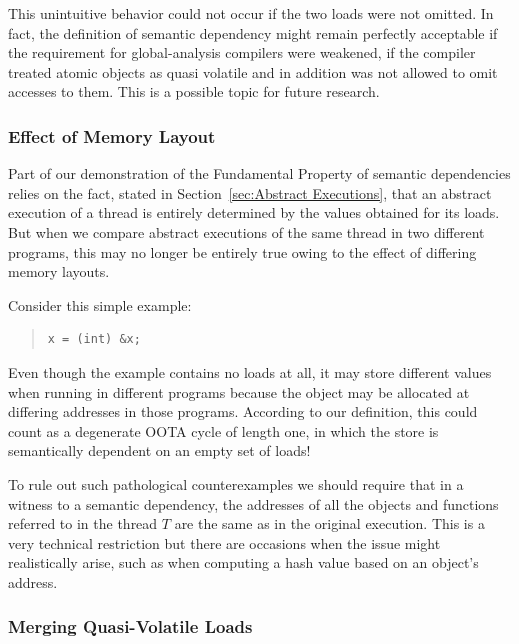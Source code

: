 \documentclass[10]{article}
\begin{document}
This unintuitive behavior could not occur if the two loads were not
omitted.
In fact, the definition of semantic dependency might remain
perfectly acceptable if the requirement for global-analysis compilers
were weakened, if the compiler treated atomic objects as quasi
volatile and in addition was not allowed to omit accesses to them.
This is a possible topic for future research.

\subsubsection{Effect of Memory Layout}
\label{sec:Effect of Memory Layout}

Part of our demonstration of the Fundamental Property of semantic
dependencies relies on the fact, stated in
Section~\ref{sec:Abstract Executions},
that an abstract execution of a thread is entirely determined by the
values obtained for its loads.
But when we compare abstract executions of the same thread in two
different programs, this may no longer be entirely true owing to the
effect of differing memory layouts.

Consider this simple example:
\begin{quote}
\begin{verbatim}
x = (int) &x;
\end{verbatim}
\end{quote}
Even though the example contains no loads at all, it may store
different values when running in different programs because the
object  may be allocated at differing addresses in those
programs.
According to our definition, this could count as a degenerate OOTA
cycle of length one, in which the store is semantically dependent on
an empty set of loads!

To rule out such pathological counterexamples we should require that
in a witness to a semantic dependency, the addresses of all the
objects and functions referred to in the thread $T$ are the same as
in the original execution.
This is a very technical restriction but there are occasions when
the issue might realistically arise, such as when computing a hash
value based on an object's address.

\subsubsection{Merging Quasi-Volatile Loads}
\label{sec:Merging Quasi-Volatile Loads}
\end{document}
